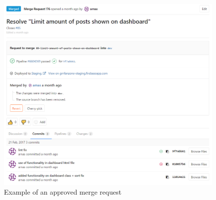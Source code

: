 \begin{figure}[h]
\begin{center}
\includegraphics[width=15cm]{figures/merge_request}
\end{center}
\caption{Example of an approved merge request}
\label{fig:merge_request}
\end{figure}